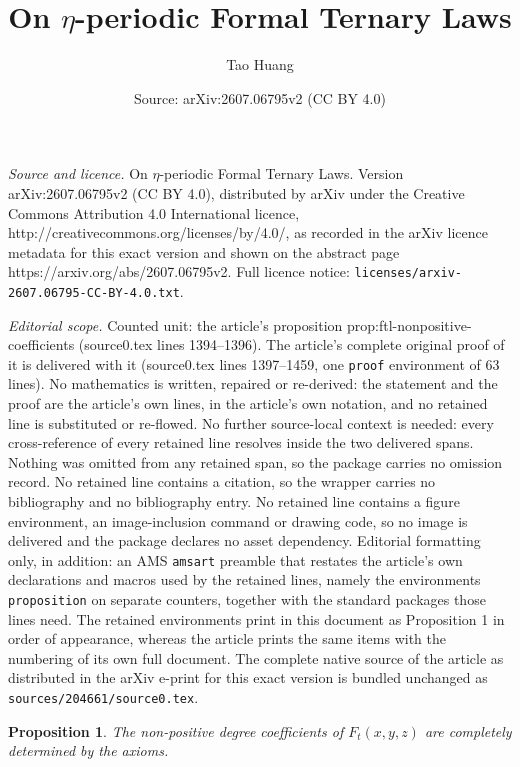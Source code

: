 \documentclass[10pt,a4paper]{amsart}
\title{On $\eta$-periodic Formal Ternary Laws}
\author{Tao Huang}
\date{Source: arXiv:2607.06795v2 (CC BY 4.0)}
\newtheorem{proposition}{Proposition}
\begin{document}
\maketitle

\noindent\emph{Source and licence.} On $\eta$-periodic Formal Ternary Laws. Version arXiv:2607.06795v2 (CC BY 4.0), distributed by arXiv under the Creative Commons Attribution 4.0 International licence, http://creativecommons.org/licenses/by/4.0/, as recorded in the arXiv licence metadata for this exact version and shown on the abstract page https://arxiv.org/abs/2607.06795v2. Full licence notice: \texttt{licenses/arxiv-2607.06795-CC-BY-4.0.txt}.\par\smallskip

\noindent\textit{Editorial scope.} Counted unit: the article's proposition prop:ftl-nonpositive-coefficients (source0.tex lines 1394--1396). The article's complete original proof of it is delivered with it (source0.tex lines 1397--1459, one \texttt{proof} environment of 63 lines). No mathematics is written, repaired or re-derived: the statement and the proof are the article's own lines, in the article's own notation, and no retained line is substituted or re-flowed.  No further source-local context is needed: every cross-reference of every retained line resolves inside the two delivered spans.  Nothing was omitted from any retained span, so the package carries no omission record.  No retained line contains a citation, so the wrapper carries no bibliography and no bibliography entry.  No retained line contains a figure environment, an image-inclusion command or drawing code, so no image is delivered and the package declares no asset dependency.  Editorial formatting only, in addition: an AMS \texttt{amsart} preamble that restates the article's own declarations and macros used by the retained lines, namely the environments \texttt{proposition} on separate counters, together with the standard packages those lines need.  The retained environments print in this document as Proposition 1 in order of appearance, whereas the article prints the same items with the numbering of its own full document.  The complete native source of the article as distributed in the arXiv e-print for this exact version is bundled unchanged as \texttt{sources/204661/source0.tex}.
\begin{proposition}\label{prop:ftl-nonpositive-coefficients}
	The non-positive degree coefficients of $F_t(x,y,z)$ are completely determined by the axioms.
\end{proposition}
\end{document}
